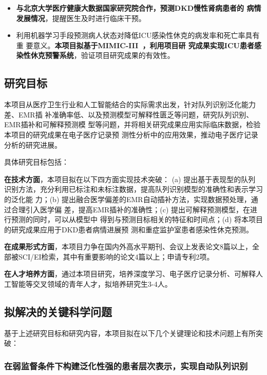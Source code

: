 \begin{itemize}
    \item  \textbf{与北京大学医疗健康大数据国家研究院合作，预测DKD慢性肾病患者的
    病情发展情况}，提醒医生及时进行临床干预。
    \item  利用机器学习手段预测病人状态对降低ICU感染性休克的病发率和死亡率具有重
    要意义。\textbf{本项目拟基于MIMIC-III~，利用项目研
    究成果实现ICU患者感染性休克预警系统}，验证项目研究成果的有效性。
\end{itemize}


\subsection{研究目标}\label{ch2target}

本项目从医疗卫生行业和人工智能结合的实际需求出发，针对队列识别泛化能力差、EMR插
补准确率低、以及预测模型可解释性匮乏等问题，研究队列识别、EMR插补和可解释预测模
型等问题，并将相关研究成果应用实际临床数据，检验本项目的研究成果在电子医疗记录预
测性分析中的应用效果，推动电子医疗记录分析的研究进展。

具体研究目标包括：

\textbf{在技术方面}，本项目拟在以下四方面实现技术突破： (a) 提出基于表现型的队列
识别方法，充分利用已标注和未标注数据，提高队列识别模型的准确性和表示学习的泛化能
力；(b) 提出融合医学偏差的EMR自动插补方法，实现数据预处理，通过合理引入医学偏
差，提高EMR插补的准确性；(c) 提出可解释预测模型，在进行预测的同时，可以从模型中
得到与预测目标相关的特征和时间点；(d) 将本项目的研究成果应用于DKD患者病情进展预
测和重症监护室患者感染性休克预测。

\textbf{在成果形式方面}，本项目力争在国内外高水平期刊、会议上发表论文8篇以上，全
部被SCI/EI检索，其中有重要影响的论文4篇以上；申请专利2项。

\textbf{在人才培养方面}，通过本项目研究，培养深度学习、电子医疗记录分析、可解释人工智能等交叉领域的青年人才，拟培养研究生3-4人。

\subsection{拟解决的关键科学问题}

基于上述研究目标和研究内容，本项目拟在以下几个关键理论和技术问题上有所突破：

\subsubsection{在弱监督条件下构建泛化性强的患者层次表示，实现自动队列识别}

